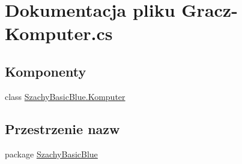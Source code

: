 \hypertarget{_gracz-_komputer_8cs}{\section{Dokumentacja pliku Gracz-\/\-Komputer.cs}
\label{_gracz-_komputer_8cs}
}
\subsection*{Komponenty}
\begin{DoxyCompactItemize}
\item 
class \hyperlink{class_szachy_basic_blue_1_1_komputer}{Szachy\-Basic\-Blue.\-Komputer}
\end{DoxyCompactItemize}
\subsection*{Przestrzenie nazw}
\begin{DoxyCompactItemize}
\item 
package \hyperlink{namespace_szachy_basic_blue}{Szachy\-Basic\-Blue}
\end{DoxyCompactItemize}
